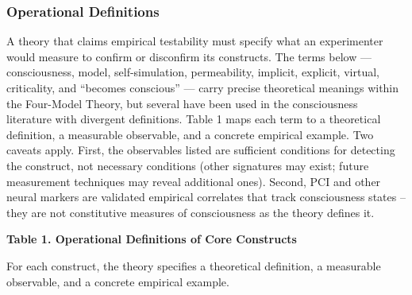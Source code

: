 \documentclass[12pt]{article}
\begin{document}
\subsubsection{Operational Definitions}

A theory that claims empirical testability must specify what an experimenter would measure to confirm or disconfirm its constructs. The terms below --- consciousness, model, self-simulation, permeability, implicit, explicit, virtual, criticality, and ``becomes conscious'' --- carry precise theoretical meanings within the Four-Model Theory, but several have been used in the consciousness literature with divergent definitions. Table 1 maps each term to a theoretical definition, a measurable observable, and a concrete empirical example. Two caveats apply. First, the observables listed are sufficient conditions for detecting the construct, not necessary conditions (other signatures may exist; future measurement techniques may reveal additional ones). Second, PCI and other neural markers are validated empirical correlates that track consciousness states -- they are not constitutive measures of consciousness as the theory defines it.


\noindent\textbf{Table 1. Operational Definitions of Core Constructs}

\medskip
\noindent For each construct, the theory specifies a theoretical definition, a measurable observable, and a concrete empirical example.
\end{document}
